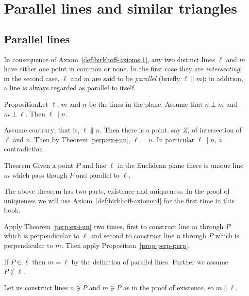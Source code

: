 \chapter{Parallel lines and similar triangles}\label{chap:parallel}

\section*{Parallel lines}

In consequence of Axiom~\ref{def:birkhoff-axioms:1}, 
any two distinct lines $\ell$ and $m$ have either one point
in common or none. 
In the first case they are \emph{intersecting}; 
in the second case, $\ell$ and $m$ are said to be \emph{parallel} (briefly \index{$\parallel$}$\ell\parallel m$);
in addition, a line is always regarded as parallel to itself.


\begin{thm}{Proposition}\label{prop:perp-perp}Let $\ell$, $m$ and $n$ be the lines in the plane.
Assume that $n\perp m$ and $m\perp \ell$.
Then $\ell\parallel n$. 
\end{thm}

Assume contrary; 
that is, $\ell\nparallel n$.
Then there is a point, say $Z$, of intersection of $\ell$ and $n$.
Then by Theorem \ref{perp:ex+un},
$\ell=n$.
In particular $\ell\parallel n$, a contradiction.
\qeds

\begin{thm}{Theorem}\label{thm:parallel}
Given a point $P$ and line $\ell$ in the Euclidean plane
there is unique line $m$
which pass though $P$ and parallel to $\ell$.
\end{thm}

The above theorem has two parts, existence and uniqueness.
In the proof of uniqueness we will use Axiom~\ref{def:birkhoff-axioms:4} for the first time in this book.

Apply Theorem \ref{perp:ex+un} two times,
first to construct line $m$ through $P$ which is perpendicular to $\ell$
and second to construct line $n$ through $P$ which is perpendicular to $m$.
Then apply Proposition~\ref{prop:perp-perp}.

If $P\in\ell$ then $m=\ell$ by the definition of parallel lines.
Further we assume $P\notin\ell$.

Let us construct lines $n\ni P$ and $m\ni P$ as in the proof of existence, so $m\parallel \ell$.

